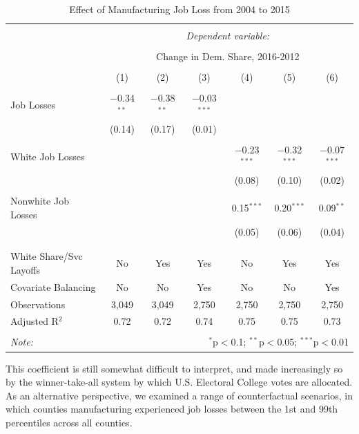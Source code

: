 \documentclass[]{AEA}
\begin{document}
\begin{table}[!htbp] \centering 
  \caption{Effect of Manufacturing Job Loss from 2004 to 2015} 
  \label{regResult04} 
\small 
\begin{tabular}{@{\extracolsep{2pt}}lcccccc} 
\\[-1.8ex]\hline 
\hline \\[-1.8ex] 
 & \multicolumn{6}{c}{\textit{Dependent variable:}} \\ 
\cline{2-7} 
\\[-1.8ex] & \multicolumn{6}{c}{Change in Dem. Share, 2016-2012} \\ 
\\[-1.8ex] & (1) & (2) & (3) & (4) & (5) & (6)\\ 
\hline \\[-1.8ex] 
 Job Losses & $-$0.34$^{**}$ & $-$0.38$^{**}$ & $-$0.03$^{***}$ &  &  &  \\ 
  & (0.14) & (0.17) & (0.01) &  &  &  \\ 
  & & & & & & \\ 
 White Job Losses &  &  &  & $-$0.23$^{***}$ & $-$0.32$^{***}$ & $-$0.07$^{***}$ \\ 
  &  &  &  & (0.08) & (0.10) & (0.02) \\ 
  & & & & & & \\ 
 Nonwhite Job Losses &  &  &  & 0.15$^{***}$ & 0.20$^{***}$ & 0.09$^{**}$ \\ 
  &  &  &  & (0.05) & (0.06) & (0.04) \\ 
  & & & & & & \\ 
\hline \\[-1.8ex] 
White Share/Svc Layoffs & No & Yes & Yes & No & Yes & Yes \\ 
Covariate Balancing & No & No & Yes & No & No & Yes \\ 
Observations & 3,049 & 3,049 & 2,750 & 2,750 & 2,750 & 2,750 \\ 
Adjusted R$^{2}$ & 0.72 & 0.72 & 0.74 & 0.75 & 0.75 & 0.73 \\ 
\hline 
\hline \\[-1.8ex] 
\textit{Note:}  & \multicolumn{6}{r}{$^{*}$p$<$0.1; $^{**}$p$<$0.05; $^{***}$p$<$0.01} \\ 
\end{tabular} 
\end{table} 
\FloatBarrier

This coefficient is still somewhat difficult to interpret, and made
increasingly so by the winner-take-all system by which U.S. Electoral
College votes are allocated. As an alternative perspective, we examined
a range of counterfactual scenarios, in which counties manufacturing
experienced job losses between the 1st and 99th percentiles across all
counties.
\end{document}
